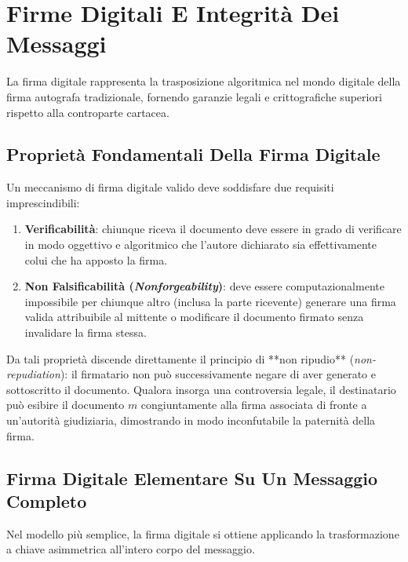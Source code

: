 \documentclass[11pt, a4paper]{article}
\begin{document}
\newpage

\section{Firme Digitali E Integrità Dei Messaggi}

La firma digitale rappresenta la trasposizione algoritmica nel mondo digitale della firma autografa tradizionale, fornendo garanzie legali e crittografiche superiori rispetto alla controparte cartacea.


\subsection{Proprietà Fondamentali Della Firma Digitale}

Un meccanismo di firma digitale valido deve soddisfare due requisiti imprescindibili:
\begin{enumerate}[leftmargin=*]
    \item \textbf{Verificabilità}: chiunque riceva il documento deve essere in grado di verificare in modo oggettivo e algoritmico che l'autore dichiarato sia effettivamente colui che ha apposto la firma.
    \item \textbf{Non Falsificabilità (\emph{Nonforgeability})}: deve essere computazionalmente impossibile per chiunque altro (inclusa la parte ricevente) generare una firma valida attribuibile al mittente o modificare il documento firmato senza invalidare la firma stessa.
\end{enumerate}

Da tali proprietà discende direttamente il principio di **non ripudio** (\emph{non-repudiation}): il firmatario non può successivamente negare di aver generato e sottoscritto il documento. Qualora insorga una controversia legale, il destinatario può esibire il documento $m$ congiuntamente alla firma associata di fronte a un'autorità giudiziaria, dimostrando in modo inconfutabile la paternità della firma.

\subsection{Firma Digitale Elementare Su Un Messaggio Completo}

Nel modello più semplice, la firma digitale si ottiene applicando la trasformazione a chiave asimmetrica all'intero corpo del messaggio.
\end{document}
